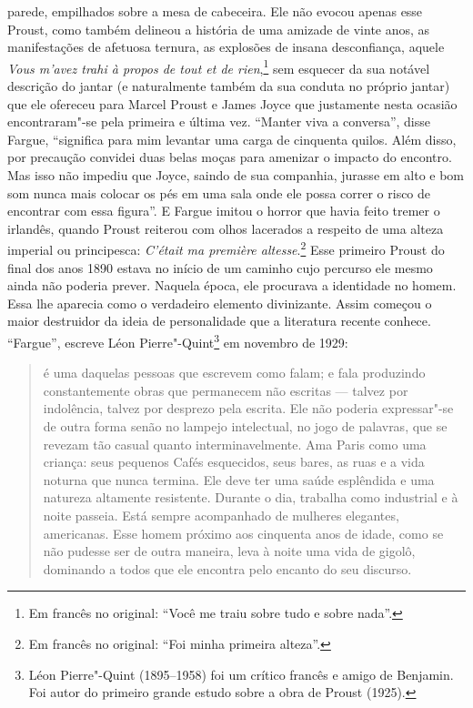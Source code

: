 parede, empilhados sobre a mesa de cabeceira. Ele não evocou apenas esse Proust,
como também delineou a história de uma amizade de vinte anos, as
manifestações de afetuosa ternura, as explosões de insana desconfiança,
aquele \emph{Vous m'avez trahi à propos de tout et de rien},\footnote{Em francês no original: ``Você me traiu sobre tudo e sobre nada''. \versal{[N.~T.]}}
sem esquecer da sua notável descrição do jantar (e naturalmente também
da sua conduta no próprio jantar) que ele ofereceu para Marcel Proust e
James Joyce que justamente nesta ocasião encontraram"-se pela primeira e
última vez. ``Manter viva a conversa'', disse Fargue, ``significa para
mim levantar uma carga de cinquenta quilos. Além disso, por precaução
convidei duas belas moças para amenizar o impacto do encontro. Mas isso
não impediu que Joyce, saindo de sua companhia, jurasse em alto e bom
som nunca mais colocar os pés em uma sala onde ele possa correr o risco
de encontrar com essa figura''. E Fargue imitou o horror que havia feito
tremer o irlandês, quando Proust reiterou com olhos lacerados a respeito
de uma alteza imperial ou principesca: \emph{C'était ma première
altesse}.\footnote{Em francês no original: ``Foi minha primeira alteza''. \versal{[N.~T.]}} Esse primeiro Proust do final dos anos 1890 estava no
início de um caminho cujo percurso ele mesmo ainda não poderia prever.
Naquela época, ele procurava a identidade no homem. Essa lhe aparecia
como o verdadeiro elemento divinizante. Assim começou o maior destruidor
da ideia de personalidade que a literatura recente conhece. ``Fargue'',
escreve Léon Pierre"-Quint\footnote{Léon Pierre"-Quint (1895--1958) foi
  um crítico francês e amigo de Benjamin. Foi autor do primeiro grande
  estudo sobre a obra de Proust (1925). \versal{[N.~O.]}} em novembro de 1929:

\begin{quote}
é uma daquelas pessoas que escrevem como falam; e fala produzindo
constantemente obras que permanecem não escritas --- talvez por
indolência, talvez por desprezo pela escrita. Ele não poderia
expressar"-se de outra forma senão no lampejo intelectual, no jogo de
palavras, que se revezam tão casual quanto interminavelmente. Ama Paris
como uma criança: seus pequenos Cafés esquecidos, seus bares, as ruas e
a vida noturna que nunca termina. Ele deve ter uma saúde esplêndida e
uma natureza altamente resistente. Durante o dia, trabalha como
industrial e à noite passeia. Está sempre acompanhado de mulheres
elegantes, americanas. Esse homem próximo aos cinquenta anos de idade,
como se não pudesse ser de outra maneira, leva à noite uma vida de
gigolô, dominando a todos que ele encontra pelo encanto do seu discurso.
\end{quote}

